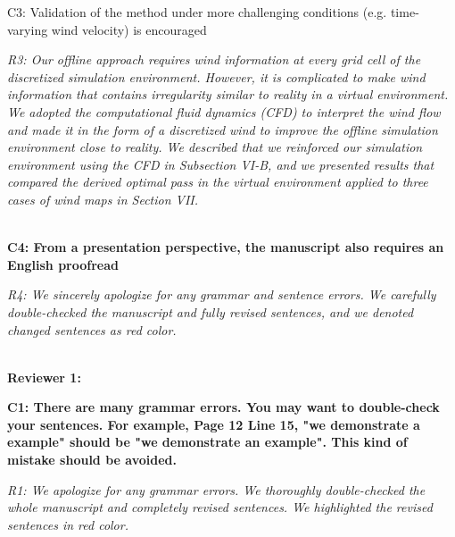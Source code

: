 \documentclass[onecolumn]{IEEEconf}
\begin{document}
\begin{description}
	{
	C3: Validation of the method under more challenging conditions (e.g. time-varying wind velocity) is encouraged
	}
	\item \textit
	{
	R3: Our offline approach requires wind information at every grid cell of the discretized simulation environment. However, it is complicated to make wind information that contains irregularity similar to reality in a virtual environment. We adopted the computational fluid dynamics (CFD) to interpret the wind flow and made it in the form of a discretized wind to improve the offline simulation environment close to reality.
    We described that we reinforced our simulation environment using the CFD in Subsection VI-B, and we presented results that compared the derived optimal pass in the virtual environment applied to three cases of wind maps in Section VII.
	}
	~\\
	~\\
	\item \textbf
	{
	C4: From a presentation perspective, the manuscript also requires an English proofread 
	}
	\item \textit
	{
	R4: We sincerely apologize for any grammar and sentence errors. 
    We carefully double-checked the manuscript and fully revised sentences, and we denoted changed sentences as red color. 
	}
	~\\
	~\\
\end{description}
    
\textbf{\large Reviewer 1:}\\
\begin{description}
    \item \textbf
	{
	C1: There are many grammar errors. You may want to double-check your sentences. For example,  Page 12 Line 15, "we demonstrate a example" should be "we demonstrate an example". This kind of mistake should be avoided. 
	}
	\item \textit
	{
	R1: We apologize for any grammar errors. We thoroughly double-checked the whole manuscript and completely revised sentences. We highlighted the revised sentences in red color.
	}
	~\\
    ~\\
\end{description}
\end{document}
